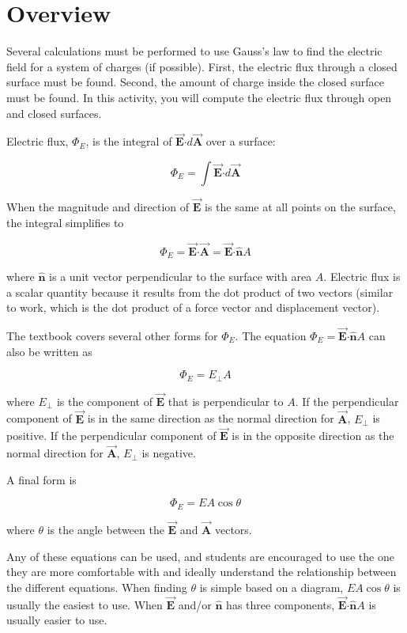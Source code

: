 \documentclass{article}
\newcommand{\bfvec}[1]{\vec{\mathbf{#1}}}
\newcommand{\bfcdot}[0]{\boldsymbol{\cdot}}
\begin{document}
\section{Overview}

Several calculations must be performed to use Gauss's law to find the electric field for a system of charges (if possible). First, the electric flux through a closed surface must be found. Second, the amount of charge inside the closed surface must be found. In this activity, you will compute the electric flux through open and closed surfaces.

Electric flux, $\Phi_E$, is the integral of $\bfvec{E}\bfcdot d\bfvec{A}$ over a surface:

$$
\Phi_E=\int\bfvec{E}\bfcdot d\bfvec{A}
$$

When the magnitude and direction of $\bfvec{E}$ is the same at all points on the surface, the integral simplifies to 

$$
\Phi_E = \bfvec{E}\bfcdot \bfvec{A}=\bfvec{E}\bfcdot \hat{\mathbf{n}}A
$$

where $\hat{\mathbf{n}}$ is a unit vector perpendicular to the surface with area $A$. Electric flux is a scalar quantity because it results from the dot product of two vectors (similar to work, which is the dot product of a force vector and displacement vector).

The textbook covers several other forms for $\Phi_E$. The equation $\Phi_E = \bfvec{E}\bfcdot \hat{\mathbf{n}}A$ can also be written as

$$
\Phi_E = E_{\perp}A
$$

where $E_{\perp}$ is the component of $\bfvec{E}$ that is perpendicular to $A$. If the perpendicular component of $\bfvec{E}$ is in the same direction as the normal direction for $\bfvec{A}$, $E_{\perp}$ is positive. If the perpendicular component of $\bfvec{E}$ is in the opposite direction as the normal direction for $\bfvec{A}$, $E_{\perp}$ is negative.

A final form is

$$
\Phi_E = EA\cos\theta
$$

where $\theta$ is the angle between the $\bfvec{E}$ and $\bfvec{A}$ vectors.

Any of these equations can be used, and students are encouraged to use the one they are more comfortable with and ideally understand the relationship between the different equations. When finding $\theta$ is simple based on a diagram, $EA\cos\theta$ is usually the easiest to use. When $\bfvec{E}$ and/or $\hat{\mathbf{n}}$ has three components, $\bfvec{E}\bfcdot \hat{\mathbf{n}}A$ is usually easier to use.
\end{document}

